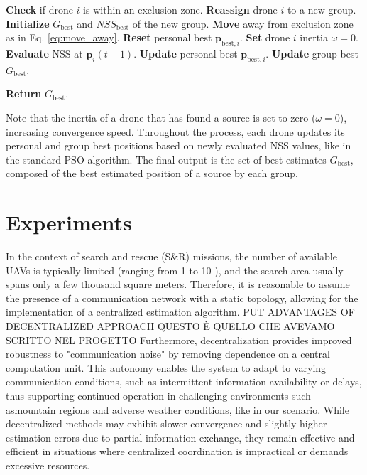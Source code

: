 \begin{algorithm}
\begin{algorithmic}[1]
                \State \textbf{Check} if drone \( i \) is within an exclusion zone.
                        \State \textbf{Reassign} drone \( i \) to a new group.
                        \State \textbf{Initialize} \( G_{\text{best}} \) and \(\textit{NSS}_{\text{best}}\) of the new group.
                    \EndIf
                    \State \textbf{Move} away from exclusion zone as in Eq. \eqref{eq:move_away}.
                    \State \textbf{Reset} personal best \(\mathbf{p}_{\text{best}, i}\).
                    \State \textbf{Set} drone \( i \) inertia \(\omega = 0\).
                \Else
                    \State \textbf{Evaluate} NSS at \(\mathbf{p}_i(t+1)\).
                        \State \textbf{Update} personal best \(\mathbf{p}_{\text{best}, i}\).
                    \EndIf
                        \State \textbf{Update} group best \( G_{\text{best}} \).
                    \EndIf
                \EndIf
            \EndFor
        \EndFor
        
        \State \textbf{Return} \( G_{\text{best}} \).
    \end{algorithmic}
\end{algorithm}
Note that the inertia of a drone that has found a source is set to zero (\(\omega = 0\)), increasing
convergence speed.
Throughout the process, each drone updates its personal 
and group best positions based on newly evaluated NSS 
values, like in the standard PSO algorithm. The final output is the set of best estimates 
\( G_{\text{best}} \), composed of the best estimated position of a source by each group.


\section{Experiments}
In the context of search and rescue (S\&R) missions, the number of available 
UAVs is typically limited (ranging from 1 to 10 \cite{PSO_original}), and the search area 
usually spans only a few thousand square meters.
Therefore, it is reasonable to 
assume the presence of a communication network with a static topology, allowing 
for the implementation of a centralized estimation algorithm.
PUT ADVANTAGES OF DECENTRALIZED APPROACH
QUESTO È QUELLO CHE AVEVAMO SCRITTO NEL PROGETTO
Furthermore, decentralization provides improved robustness to "communication noise" by removing 
dependence on a central computation unit. This autonomy enables the system to adapt to varying 
communication conditions, such as intermittent information availability or delays, thus supporting 
continued operation in challenging environments such asmountain regions and adverse weather 
conditions, like in our scenario. While decentralized methods may exhibit slower convergence and slightly higher estimation 
errors due to partial information exchange, they remain effective and efficient in situations where 
centralized coordination is impractical or demands excessive resources.